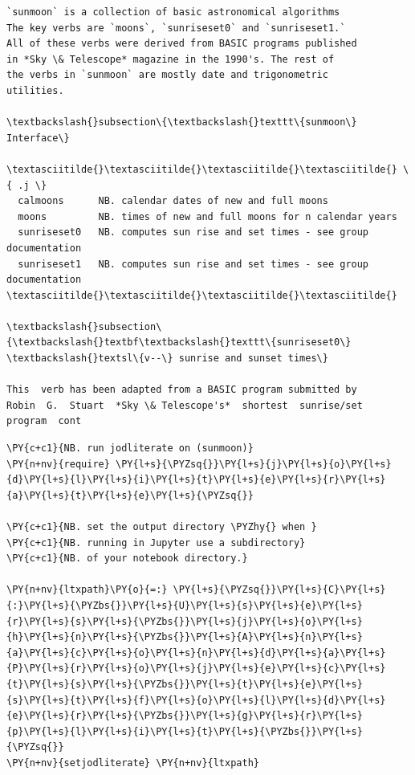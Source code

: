     \begin{Verbatim}[commandchars=\\\{\}]
﻿`sunmoon` is a collection of basic astronomical algorithms
The key verbs are `moons`, `sunriseset0` and `sunriseset1.`
All of these verbs were derived from BASIC programs published
in *Sky \& Telescope* magazine in the 1990's. The rest of
the verbs in `sunmoon` are mostly date and trigonometric
utilities.

\textbackslash{}subsection\{\textbackslash{}texttt\{sunmoon\} Interface\}

\textasciitilde{}\textasciitilde{}\textasciitilde{}\textasciitilde{} \{ .j \}
  calmoons      NB. calendar dates of new and full moons
  moons         NB. times of new and full moons for n calendar years
  sunriseset0   NB. computes sun rise and set times - see group documentation
  sunriseset1   NB. computes sun rise and set times - see group documentation
\textasciitilde{}\textasciitilde{}\textasciitilde{}\textasciitilde{}

\textbackslash{}subsection\{\textbackslash{}textbf\textbackslash{}texttt\{sunriseset0\} \textbackslash{}textsl\{v--\} sunrise and sunset times\}

This  verb has been adapted from a BASIC program submitted by
Robin  G.  Stuart  *Sky \& Telescope's*  shortest  sunrise/set
program  cont
    \end{Verbatim}

    \begin{tcolorbox}[breakable, size=fbox, boxrule=1pt, pad at break*=1mm,colback=cellbackground, colframe=cellborder]
\begin{Verbatim}[commandchars=\\\{\}]
\PY{c+c1}{NB. run jodliterate on (sunmoon)}
\PY{n+nv}{require} \PY{l+s}{\PYZsq{}}\PY{l+s}{j}\PY{l+s}{o}\PY{l+s}{d}\PY{l+s}{l}\PY{l+s}{i}\PY{l+s}{t}\PY{l+s}{e}\PY{l+s}{r}\PY{l+s}{a}\PY{l+s}{t}\PY{l+s}{e}\PY{l+s}{\PYZsq{}}

\PY{c+c1}{NB. set the output directory \PYZhy{} when }
\PY{c+c1}{NB. running in Jupyter use a subdirectory}
\PY{c+c1}{NB. of your notebook directory.}

\PY{n+nv}{ltxpath}\PY{o}{=:} \PY{l+s}{\PYZsq{}}\PY{l+s}{C}\PY{l+s}{:}\PY{l+s}{\PYZbs{}}\PY{l+s}{U}\PY{l+s}{s}\PY{l+s}{e}\PY{l+s}{r}\PY{l+s}{s}\PY{l+s}{\PYZbs{}}\PY{l+s}{j}\PY{l+s}{o}\PY{l+s}{h}\PY{l+s}{n}\PY{l+s}{\PYZbs{}}\PY{l+s}{A}\PY{l+s}{n}\PY{l+s}{a}\PY{l+s}{c}\PY{l+s}{o}\PY{l+s}{n}\PY{l+s}{d}\PY{l+s}{a}\PY{l+s}{P}\PY{l+s}{r}\PY{l+s}{o}\PY{l+s}{j}\PY{l+s}{e}\PY{l+s}{c}\PY{l+s}{t}\PY{l+s}{s}\PY{l+s}{\PYZbs{}}\PY{l+s}{t}\PY{l+s}{e}\PY{l+s}{s}\PY{l+s}{t}\PY{l+s}{f}\PY{l+s}{o}\PY{l+s}{l}\PY{l+s}{d}\PY{l+s}{e}\PY{l+s}{r}\PY{l+s}{\PYZbs{}}\PY{l+s}{g}\PY{l+s}{r}\PY{l+s}{p}\PY{l+s}{l}\PY{l+s}{i}\PY{l+s}{t}\PY{l+s}{\PYZbs{}}\PY{l+s}{\PYZsq{}} 
\PY{n+nv}{setjodliterate} \PY{n+nv}{ltxpath}
\end{Verbatim}
\end{tcolorbox}

